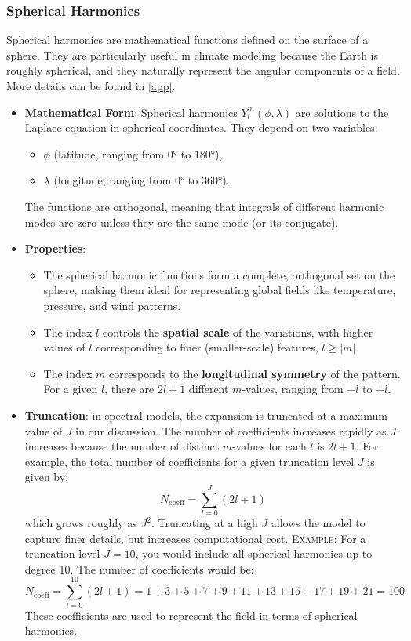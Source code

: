 \subsubsection{Spherical Harmonics}
Spherical harmonics are mathematical functions defined on the surface of a sphere. They are particularly useful in climate modeling because the Earth is roughly spherical, and they naturally represent the angular components of a field. More details can be found in \ref{app}.

\begin{itemize}
	\item \textbf{Mathematical Form}: Spherical harmonics $Y_l^m(\phi,\lambda)$ are solutions to the Laplace equation in spherical coordinates. They depend on two variables:
	      \begin{itemize}
		      \item $\phi$ (latitude, ranging from $0°$ to $180°$),
		      \item $\lambda$ (longitude, ranging from $0°$ to $360°$).
	      \end{itemize}The functions are orthogonal, meaning that integrals of different harmonic modes are zero unless they are the same mode (or its conjugate).
	\item \textbf{Properties}:
	      \begin{itemize}
		      \item The spherical harmonic functions form a complete, orthogonal set on the sphere, making them ideal for representing global fields like temperature, pressure, and wind patterns.
		      \item The index $l$ controls the \textbf{spatial scale} of the variations, with higher values of $l$ corresponding to finer (smaller-scale) features, $l\geq|m|$.
		      \item The index $m$ corresponds to the \textbf{longitudinal symmetry} of the pattern. For a given $l$, there are $2l+1$ different $m$-values, ranging from $-l$ to $+l$.
	      \end{itemize}
	\item \textbf{Truncation}: in spectral models, the expansion is truncated at a maximum value of $J$ in our discussion. The number of coefficients increases rapidly as $J$ increases because the number of distinct $m$-values for each $l$ is $2l+1$. For example, the total number of coefficients for a given truncation level $J$ is given by:
	      $$N_{\text{coeff}}=\displaystyle\sum_{l=0}^J(2l+1)$$
	      which grows roughly as $J^2$. Truncating at a high $J$ allows the model to capture finer details, but increases computational cost.
	      \textsc{Example}: For a truncation level $J=10$, you would include all spherical harmonics up to degree 10. The number of coefficients would be:$$N_{\text{coeff}}=\displaystyle\sum_{l=0}^{10}(2l+1)=1+3+5+7+9+11+13+15+17+19+21=100$$
	      These coefficients are used to represent the field in terms of spherical harmonics.
\end{itemize}

